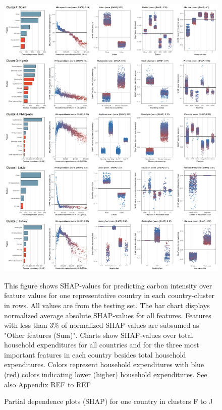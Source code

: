 \documentclass[12pt, a4paper]{article}
\newenvironment{subcaption}
{\strut
\vspace{-5pt}
\begin{minipage}[b]{0.9\textwidth}
  \hspace*{-\parindent}
  \footnotesize}
 {\end{minipage}}
\begin{document}
\begin{figure}[ht!]
    \centering
    \includegraphics[width=15.5 cm]{Figure 5/Figures_joint_2}
    \caption{Partial dependence plots (SHAP) for one country in clusters F to J}
    \label{fig:fig_5_2}
    \begin{subcaption}
    This figure shows SHAP-values for predicting carbon intensity over feature values for one representative country in each country-cluster in rows. All values are from the testing set. The bar chart displays normalized average absolute SHAP-values for all features. Features with less than 3\% of normalized SHAP-values are subsumed as "Other features (Sum)". Charts show SHAP-values over total household expenditures for all countries and for the three most important features in each country besides total household expenditures. Colors represent household expenditures with blue (red) colors indicating lower (higher) household expenditures. See also Appendix REF to REF
    \end{subcaption}
\end{figure}
\end{document}
